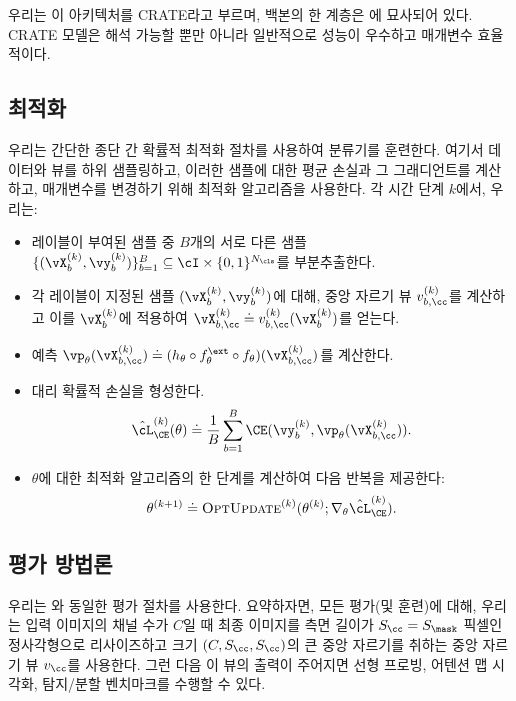 \documentclass[../../book-main_ko.tex]{subfiles}
\begin{document}
우리는 이 아키텍처를 CRATE라고 부르며, 백본의 한 계층은 에 묘사되어 있다. CRATE 모델은 해석 가능할 뿐만 아니라 일반적으로 성능이 우수하고 매개변수 효율적이다.

\subsection{최적화} \label{sub:image_classification_optimization}

우리는 간단한 종단 간 확률적 최적화 절차를 사용하여 분류기를 훈련한다. 여기서 데이터와 뷰를 하위 샘플링하고, 이러한 샘플에 대한 평균 손실과 그 그래디언트를 계산하고, 매개변수를 변경하기 위해 최적화 알고리즘을 사용한다. 각 시간 단계 \(k\)에서, 우리는:
\begin{itemize}
    \item 레이블이 부여된 샘플 중 \(B\)개의 서로 다른 샘플 \(\{(\vX_{b}^{(k)}, \vy_{b}^{(k)})\}_{b = 1}^{B} \subseteq \cI \times \{0, 1\}^{N_{\cls}}\)를 부분추출한다.    
    \item 각 레이블이 지정된 샘플 \((\vX_{b}^{(k)}, \vy_{b}^{(k)})\)에 대해, 중앙 자르기 뷰 \(v_{b, \cc}^{(k)}\)를 계산하고 이를 \(\vX_{b}^{(k)}\)에 적용하여 \(\vX_{b, \cc}^{(k)} \doteq v_{b, \cc}^{(k)}(\vX_{b}^{(k)})\)를 얻는다.
    \item 예측 \(\vp_{\theta}(\vX_{b, \cc}^{(k)}) \doteq (h_{\theta} \circ f_{\theta}^{\ext} \circ f_{\theta})(\vX_{b, \cc}^{(k)})\)를 계산한다.
    \item 대리 확률적 손실을 형성한다.
    \begin{equation}
        \hat{\cL}_{\CE}^{(k)}(\theta) \doteq \frac{1}{B}\sum_{b = 1}^{B}\CE(\vy_{b}^{(k)}, \vp_{\theta}(\vX_{b, \cc}^{(k)})).
    \end{equation}
    \item \(\theta\)에 대한 최적화 알고리즘의 한 단계를 계산하여 다음 반복을 제공한다:
    \begin{equation}
        \theta^{(k + 1)} \doteq \textsc{OptUpdate}^{(k)}(\theta^{(k)}; \nabla_{\theta}\hat{\cL}_{\CE}^{(k)}).
    \end{equation}
\end{itemize}

\subsection{평가 방법론} \label{sub:image_classification_evals}

우리는 와 동일한 평가 절차를 사용한다. 요약하자면, 모든 평가(및 훈련)에 대해, 우리는 입력 이미지의 채널 수가 \(C\)일 때 최종 이미지를 측면 길이가 \(S_{\cc} = S_{\mask}\) 픽셀인 정사각형으로 리사이즈하고 크기 \((C, S_{\cc}, S_{\cc})\)의 큰 중앙 자르기를 취하는 중앙 자르기 뷰 \(v_{\cc}\)를 사용한다. 그런 다음 이 뷰의 출력이 주어지면 선형 프로빙, 어텐션 맵 시각화, 탐지/분할 벤치마크를 수행할 수 있다.
\end{document}
